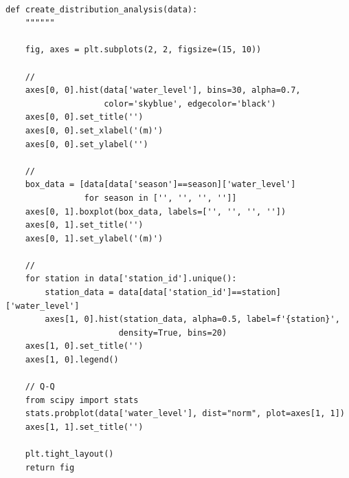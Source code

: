 \hypertarget{section-117}{%
\paragraph{}\label{section-117}}

\begin{lstlisting}[style=python]
def create_distribution_analysis(data):
    """"""
    
    fig, axes = plt.subplots(2, 2, figsize=(15, 10))
    
    // 
    axes[0, 0].hist(data['water_level'], bins=30, alpha=0.7, 
                    color='skyblue', edgecolor='black')
    axes[0, 0].set_title('')
    axes[0, 0].set_xlabel('(m)')
    axes[0, 0].set_ylabel('')
    
    // 
    box_data = [data[data['season']==season]['water_level'] 
                for season in ['', '', '', '']]
    axes[0, 1].boxplot(box_data, labels=['', '', '', ''])
    axes[0, 1].set_title('')
    axes[0, 1].set_ylabel('(m)')
    
    // 
    for station in data['station_id'].unique():
        station_data = data[data['station_id']==station]['water_level']
        axes[1, 0].hist(station_data, alpha=0.5, label=f'{station}', 
                       density=True, bins=20)
    axes[1, 0].set_title('')
    axes[1, 0].legend()
    
    // Q-Q
    from scipy import stats
    stats.probplot(data['water_level'], dist="norm", plot=axes[1, 1])
    axes[1, 1].set_title('')
    
    plt.tight_layout()
    return fig
\end{lstlisting}

\hypertarget{section-118}{%
\paragraph{}\label{section-118}}

